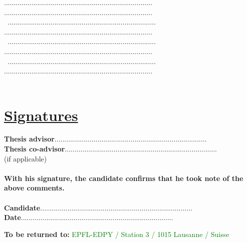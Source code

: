 \documentclass[11pt,titlepage]{article}
\begin{document}
............................................................................
............................................................................\\\
............................................................................
............................................................................\\\
............................................................................
............................................................................\\\
............................................................................
............................................................................\\\

\section*{\underline{Signatures}\\}
\noindent \textbf{Thesis advisor}\hspace{6.25cm}..............................................................................\vspace{0.5cm}\\

\noindent \textbf{Thesis co-advisor}\hspace{5.7cm}..............................................................................\\
\noindent  (if applicable)\\\\

\noindent \textbf{With his signature, the candidate confirms that he took note of the above comments.}\\\\
\textbf{Candidate}\hspace{7cm}..............................................................................\vspace{0.5cm}\\

\noindent \textbf{Date}\hspace{8.05cm}..............................................................................\\

\vspace{0.8cm}
\begin{center}
\end{center}
\begin{center}
\textbf{To be returned to:} \textcolor{green}{EPFL-EDPY / Station 3 / 1015 Lausanne / Suisse}
\end{center}
\end{document}
